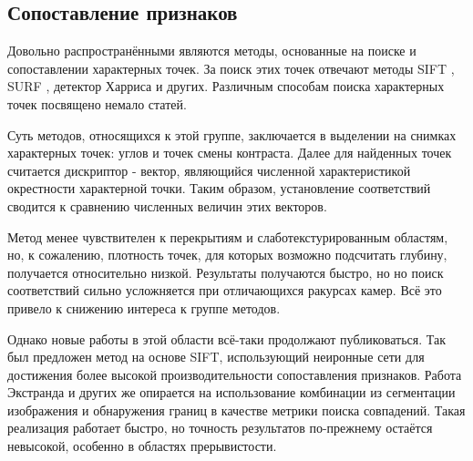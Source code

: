 \subsection{Сопоставление признаков}
Довольно распространёнными являются методы, основанные на поиске и сопоставлении характерных точек. За поиск этих точек отвечают методы 
SIFT \cite{sift}, SURF \cite{surf}, детектор Харриса и других. Различным способам поиска характерных точек посвящено немало статей. 

Суть методов, относящихся к этой группе, заключается в выделении на снимках характерных точек: углов и точек смены контраста. Далее 
для найденных точек считается дискриптор - вектор, являющийся численной характеристикой окрестности характерной точки. Таким образом,
установление соответствий сводится к сравнению численных величин этих векторов. 

Метод менее чувствителен к перекрытиям и слаботекстурированным областям, 
но, к сожалению, плотность точек, для которых возможно подсчитать глубину, получается относительно низкой. Результаты получаются быстро, но 
но поиск соответствий сильно усложняется при отличающихся ракурсах камер. Всё это привело к снижению интереса к группе методов.

Однако новые работы в этой области всё-таки продолжают публиковаться. Так был предложен метод на основе SIFT, использующий неиронные сети для 	
достижения более высокой производительности \cite{modsift} сопоставления признаков.   Работа Экстранда и других \cite{ekstrand2015high} же опирается на 
использование комбинации из сегментации изображения и обнаружения границ в качестве метрики поиска совпадений. Такая реализация работает быстро, но точность 
результатов по-прежнему остаётся невысокой, особенно в областях прерывистости. %

